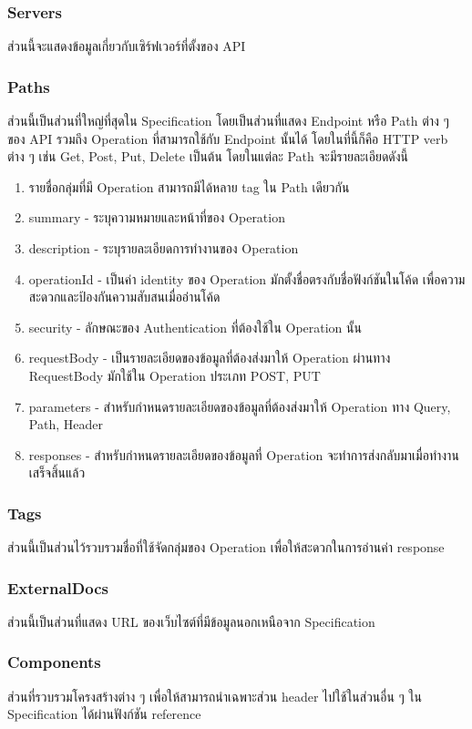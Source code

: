\subsubsection{Servers}
\raggedright ส่วนนี้จะแสดงข้อมูลเกี่ยวกับเซิร์ฟเวอร์ที่ตั้งของ API
\subsubsection{Paths}
\raggedright ส่วนนี้เป็นส่วนที่ใหญ่ที่สุดใน Specification โดยเป็นส่วนที่แสดง Endpoint หรือ Path ต่าง ๆ ของ
API รวมถึง Operation ที่สามารถใช้กับ Endpoint นั้นได้ โดยในที่นี้ก็คือ HTTP verb ต่าง ๆ เช่น Get,
Post, Put, Delete เป็นต้น โดยในแต่ละ Path จะมีรายละเอียดดังนี้
     \begin{enumerate}
    \item รายชื่อกลุ่มที่มี Operation สามารถมีได้หลาย tag ใน Path เดียวกัน
    \item summary - ระบุความหมายและหน้าที่ของ Operation
    \item description - ระบุรายละเอียดการทํางานของ Operation
    \item operationId - เป็นค่า identity ของ Operation มักตั้งชื่อตรงกับชื่อฟังก์ชันในโค้ด เพื่อความสะดวกและป้องกันความสับสนเมื่ออ่านโค้ด
    \item security - ลักษณะของ Authentication ที่ต้องใช้ใน Operation นั้น
    \item requestBody - เป็นรายละเอียดของข้อมูลที่ต้องส่งมาให้ Operation ผ่านทาง RequestBody มักใช้ใน Operation ประเภท POST, PUT
    \item  parameters - สําหรับกําหนดรายละเอียดของข้อมูลที่ต้องส่งมาให้ Operation ทาง Query, Path, Header
    \item responses - สําหรับกําหนดรายละเอียดของข้อมูลที่ Operation จะทําการส่งกลับมาเมื่อทํางานเสร็จสิ้นแล้ว
\end{enumerate}

\subsubsection{Tags}
\raggedright ส่วนนี้เป็นส่วนไว้รวบรวมชื่อที่ใช้จัดกลุ่มของ Operation เพื่อให้สะดวกในการอ่านค่า response
\subsubsection{ExternalDocs}
\raggedright ส่วนนี้เป็นส่วนที่แสดง URL ของเว็บไซต์ที่มีข้อมูลนอกเหนือจาก Specification
\subsubsection{Components}
\raggedright ส่วนที่รวบรวมโครงสร้างต่าง ๆ เพื่อให้สามารถนําเฉพาะส่วน header ไปใช้ในส่วนอื่น ๆ ใน Specification
ได้ผ่านฟังก์ชัน reference

